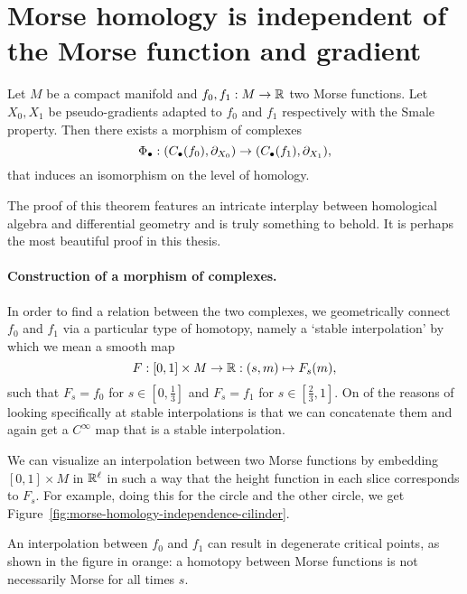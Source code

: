 \section{Morse homology is independent of the Morse function and gradient}
\begin{theorem}
    Let $M$ be a compact manifold and $ f_0, f_1: M \to  \mathbb{R}$ two Morse functions.
    Let $X_0, X_1$ be pseudo-gradients adapted to $f_0$ and $ f_1$ respectively with the Smale property.
    Then there exists a morphism of complexes
    \[
        \Phi_{\bullet}:
        (C_\bullet(f_0), \partial_{X_0}) \to  
        (C_\bullet(f_1), \partial_{X_1})
    ,\] 
    that induces an isomorphism on the level of homology.
\end{theorem}
    
\begin{myproof}
The proof of this theorem features an intricate interplay between homological algebra and differential geometry and is truly something to behold. It is perhaps the most beautiful proof in this thesis.
\paragraph{Construction of a morphism of complexes.}
In order to find a relation between the two complexes, we geometrically connect $f_0$ and $f_1$ via a particular type of homotopy, namely  a `stable interpolation' by which we mean a smooth map
\[
    F: [0,1] \times M \to \mathbb{R}: (s, m) \mapsto F_s(m)
,\] 
such that $F_s = f_0$ for $s \in \left[0, \frac{1}{3}\right]$ and $F_s = f_1$ for $s \in \left[\frac{2}{3}, 1\right]$.
On of the reasons of looking specifically at stable interpolations is that we can concatenate them and again get a $C^{\infty}$ map that is a stable interpolation.

We can visualize an interpolation between two Morse functions by embedding $[0,1] \times M$ in $\mathbb{R}^{\ell}$ in such a way that the height function in each slice corresponds to $F_s$.
For example, doing this for the circle and the other circle, we get Figure~\ref{fig:morse-homology-independence-cilinder}.

\begin{marginfigure}
    \centering
    \caption{An interpolation between $f_0$ and $f_1$ can result in degenerate critical points, as shown in the figure in orange:
        a homotopy between Morse functions is not necessarily Morse for all times $s$.
    }
    \label{fig:morse-homology-independence-cilinder}
\end{marginfigure}


\end{myproof}
